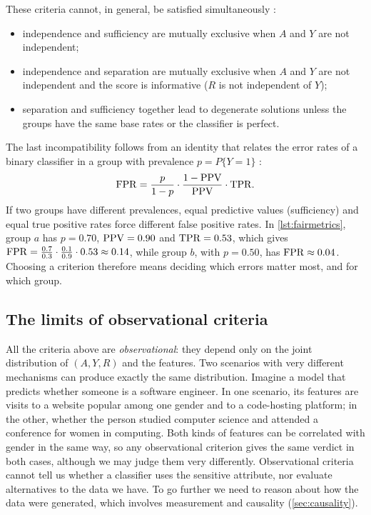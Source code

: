 These criteria cannot, in general, be satisfied simultaneously \citep{kleinberg2017inherent,chouldechova2017fair}:
\begin{itemize}
  \item independence and sufficiency are mutually exclusive when $A$ and $Y$ are not independent;
  \item independence and separation are mutually exclusive when $A$ and $Y$ are not independent
        and the score is informative ($R$ is not independent of $Y$);
  \item separation and sufficiency together lead to degenerate solutions unless the groups have
        the same base rates or the classifier is perfect.
\end{itemize}
The last incompatibility follows from an identity that relates the error rates of a binary
classifier in a group with prevalence $p=P\{Y=1\}$ \citep{chouldechova2017fair}:
\begin{equation}\label{eq:chouldechova}
  \mathrm{FPR}=\frac{p}{1-p}\cdot\frac{1-\mathrm{PPV}}{\mathrm{PPV}}\cdot\mathrm{TPR} .
\end{equation}
If two groups have different prevalences, equal predictive values (sufficiency) and equal true
positive rates force different false positive rates. In \cref{lst:fairmetrics}, group $a$ has
$p=0.70$, $\mathrm{PPV}=0.90$ and $\mathrm{TPR}=0.53$, which gives $\mathrm{FPR}=\frac{0.7}{0.3}\cdot\frac{0.1}{0.9}\cdot0.53
\approx0.14$, while group $b$, with $p=0.50$, has $\mathrm{FPR}\approx0.04$. Choosing a criterion therefore means deciding which errors matter most, and for which group.

\subsection{The limits of observational criteria}

All the criteria above are \emph{observational}: they depend only on the joint distribution of
$(A,Y,R)$ and the features. Two scenarios with very different mechanisms can produce exactly the
same distribution. Imagine a model that predicts whether someone is a software engineer. In one
scenario, its features are visits to a website popular among one gender and to a code-hosting
platform; in the other, whether the person studied computer science and attended a conference for
women in computing. Both kinds of features can be correlated with gender in the same way, so any
observational criterion gives the same verdict in both cases, although we may judge them very
differently. Observational criteria cannot tell us whether a classifier uses the sensitive
attribute, nor evaluate alternatives to the data we have. To go further we need to reason about
how the data were generated, which involves measurement and causality (\cref{sec:causality}).

